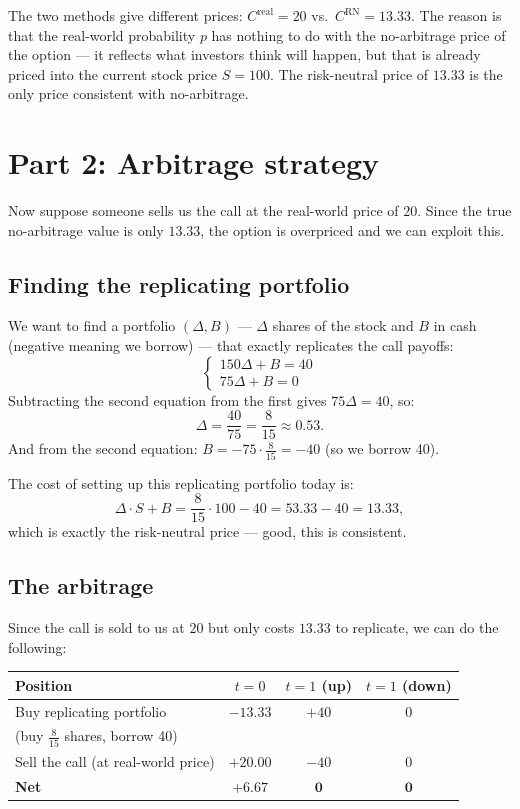\documentclass[12pt,a4paper]{article}
\begin{document}
The two methods give different prices: $C^{\text{real}} = 20$ vs.\ $C^{\text{RN}} = 13.33$. The reason is that the real-world probability $p$ has nothing to do with the no-arbitrage price of the option --- it reflects what investors think will happen, but that is already priced into the current stock price $S = 100$. The risk-neutral price of $13.33$ is the only price consistent with no-arbitrage.

\section*{Part 2: Arbitrage strategy}

Now suppose someone sells us the call at the real-world price of $20$. Since the true no-arbitrage value is only $13.33$, the option is overpriced and we can exploit this.

\subsection*{Finding the replicating portfolio}

We want to find a portfolio $(\Delta, B)$ --- $\Delta$ shares of the stock and $B$ in cash (negative meaning we borrow) --- that exactly replicates the call payoffs:
\[
\begin{cases}
150\Delta + B = 40 \\[4pt]
75\Delta + B = 0
\end{cases}
\]
Subtracting the second equation from the first gives $75\Delta = 40$, so:
\[
\Delta = \frac{40}{75} = \frac{8}{15} \approx 0.53.
\]
And from the second equation: $B = -75 \cdot \frac{8}{15} = -40$ (so we borrow 40).

The cost of setting up this replicating portfolio today is:
\[
\Delta \cdot S + B = \frac{8}{15} \cdot 100 - 40 = 53.33 - 40 = 13.33,
\]
which is exactly the risk-neutral price --- good, this is consistent.

\subsection*{The arbitrage}

Since the call is sold to us at $20$ but only costs $13.33$ to replicate, we can do the following:

\medskip
\begin{center}
\begin{tabular}{lccc}
\toprule
\textbf{Position} & $t = 0$ & $t = 1$ (up) & $t = 1$ (down) \\
\midrule
Buy replicating portfolio & $-13.33$ & $+40$ & $0$ \\
\quad (buy $\frac{8}{15}$ shares, borrow 40) & & & \\
Sell the call (at real-world price) & $+20.00$ & $-40$ & $0$ \\
\midrule
\textbf{Net} & $\mathbf{+6.67}$ & $\mathbf{0}$ & $\mathbf{0}$ \\
\bottomrule
\end{tabular}
\end{center}
\end{document}
